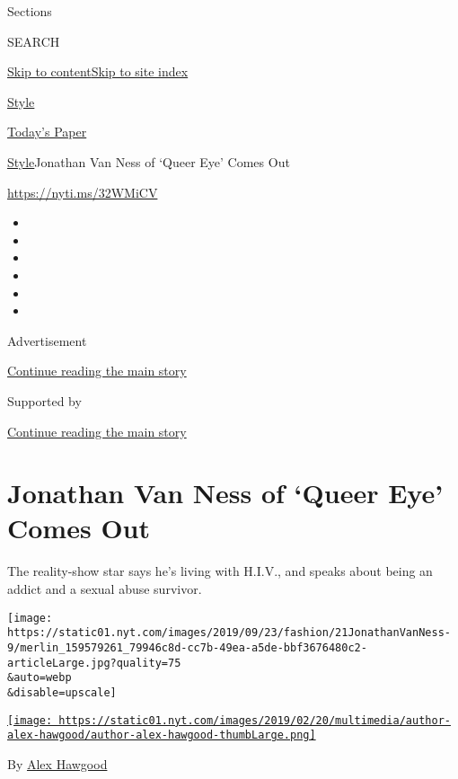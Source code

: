 Sections

SEARCH

\protect\hyperlink{site-content}{Skip to
content}\protect\hyperlink{site-index}{Skip to site index}

\href{https://www.nytimes.com/section/style}{Style}

\href{https://myaccount.nytimes.com/auth/login?response_type=cookie\&client_id=vi}{}

\href{https://www.nytimes.com/section/todayspaper}{Today's Paper}

\href{/section/style}{Style}\textbar{}Jonathan Van Ness of `Queer Eye'
Comes Out

\href{https://nyti.ms/32WMiCV}{https://nyti.ms/32WMiCV}

\begin{itemize}
\item
\item
\item
\item
\item
\item
\end{itemize}

Advertisement

\protect\hyperlink{after-top}{Continue reading the main story}

Supported by

\protect\hyperlink{after-sponsor}{Continue reading the main story}

\hypertarget{jonathan-van-ness-of-queer-eye-comes-out}{%
\section{Jonathan Van Ness of `Queer Eye' Comes
Out}\label{jonathan-van-ness-of-queer-eye-comes-out}}

The reality-show star says he's living with H.I.V., and speaks about
being an addict and a sexual abuse survivor.

\texttt{[image: https://static01.nyt.com/images/2019/09/23/fashion/21JonathanVanNess-9/merlin\_159579261\_79946c8d-cc7b-49ea-a5de-bbf3676480c2-articleLarge.jpg?quality=75\\\&auto=webp\\\&disable=upscale]}

\href{https://www.nytimes.com/by/alex-hawgood}{\texttt{[image: https://static01.nyt.com/images/2019/02/20/multimedia/author-alex-hawgood/author-alex-hawgood-thumbLarge.png]}}

By \href{https://www.nytimes.com/by/alex-hawgood}{Alex Hawgood}

